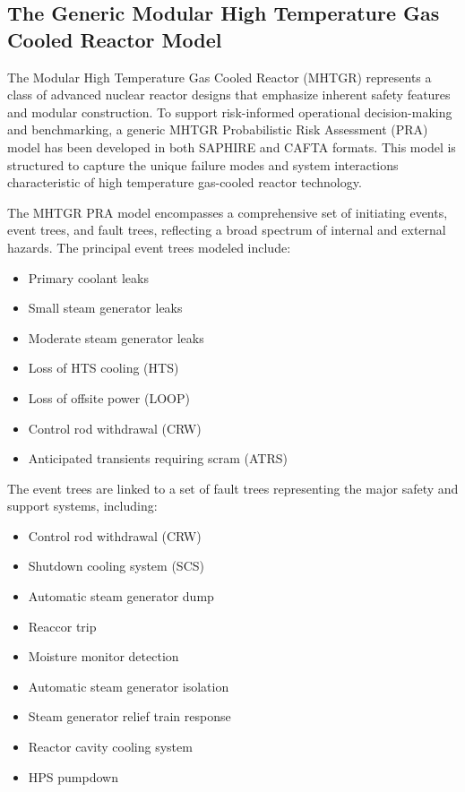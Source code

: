 \subsection{The Generic Modular High Temperature Gas Cooled Reactor Model}
\label{subsec:generic_mhtgr_dataset}

The Modular High Temperature Gas Cooled Reactor (MHTGR) represents a class of advanced nuclear reactor designs that emphasize inherent safety features and modular construction. To support risk-informed operational decision-making and benchmarking, a generic MHTGR Probabilistic Risk Assessment (PRA) model has been developed in both SAPHIRE and CAFTA formats. This model is structured to capture the unique failure modes and system interactions characteristic of high temperature gas-cooled reactor technology.

The MHTGR PRA model encompasses a comprehensive set of initiating events, event trees, and fault trees, reflecting a broad spectrum of internal and external hazards. The principal event trees modeled include:

\begin{itemize}
    \item Primary coolant leaks
    \item Small steam generator leaks
    \item Moderate steam generator leaks
    \item Loss of HTS cooling (HTS)
    \item Loss of offsite power (LOOP)
    \item Control rod withdrawal (CRW)
    \item Anticipated transients requiring scram (ATRS)
\end{itemize}

The event trees are linked to a set of fault trees representing the major safety and support systems, including:

\begin{itemize}
    \item Control rod withdrawal (CRW)
    \item Shutdown cooling system (SCS)
    \item Automatic steam generator dump
    \item Reaccor trip
    \item Moisture monitor detection
    \item Automatic steam generator isolation
    \item Steam generator relief train response
    \item Reactor cavity cooling system
    \item HPS pumpdown
\end{itemize}

